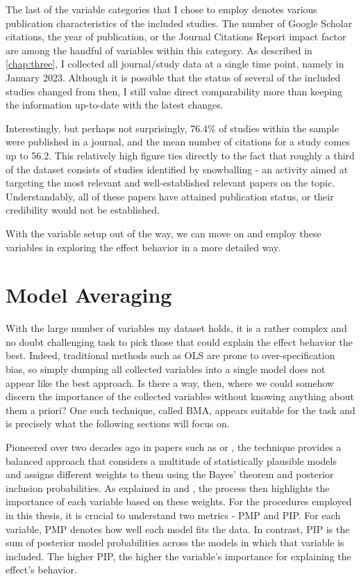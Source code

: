 The last of the variable categories that I chose to employ denotes various publication characteristics of the included studies. The number of Google Scholar citations, the year of publication, or the Journal Citations Report impact factor are among the handful of variables within this category. As described in \autoref{chap:three}, I collected all journal/study data at a single time point, namely in January 2023. Although it is possible that the status of several of the included studies changed from then, I still value direct comparability more than keeping the information up-to-date with the latest changes.

Interestingly, but perhaps not surprisingly, 76.4\% of studies within the sample were published in a journal, and the mean number of citations for a study comes up to 56.2. This relatively high figure ties directly to the fact that roughly a third of the dataset consists of studies identified by snowballing - an activity aimed at targeting the most relevant and well-established relevant papers on the topic. Understandably, all of these papers have attained publication status, or their credibility would not be established.

With the variable setup out of the way, we can move on and employ these variables in exploring the effect behavior in a more detailed way.

\section{Model Averaging}
\label{sec:bma}

With the large number of variables my dataset holds, it is a rather complex and no doubt challenging task to pick those that could explain the effect behavior the best. Indeed, traditional methods such as \ac{OLS} are prone to over-specification bias, so simply dumping all collected variables into a single model does not appear like the best approach. Is there a way, then, where we could somehow discern the importance of the collected variables without knowing anything about them a priori? One such technique, called \ac{BMA}, appears suitable for the task and is precisely what the following sections will focus on.

Pioneered over two decades ago in papers such as \cite{hoeting1999bayesian} or \cite{raftery1997bayesian}, the technique provides a balanced approach that considers a multitude of statistically plausible models and assigns different weights to them using the Bayes' theorem and posterior inclusion probabilities. As explained in \cite{hoeting1999bayesian} and \cite{amini2011bayesian}, the process then highlights the importance of each variable based on these weights. For the procedures employed in this thesis, it is crucial to understand two metrics - \ac{PMP} and \ac{PIP}. For each variable, \ac{PMP} denotes how well each model fits the data. In contrast, \ac{PIP} is the sum of posterior model probabilities across the models in which that variable is included. The higher \ac{PIP}, the higher the variable's importance for explaining the effect's behavior.

